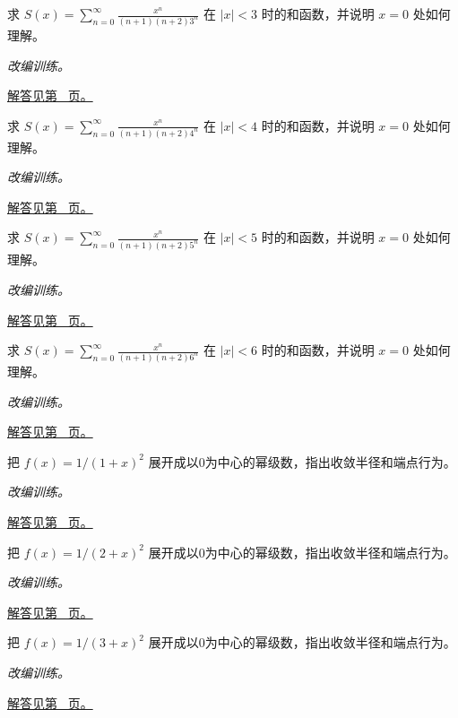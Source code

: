 \documentclass[UTF8,12pt,a4paper,fontset=fandol]{ctexart}
\begin{document}
\begin{example}[两次积分产生的系数]\label{ex:c27q15}
求 $S(x)=\displaystyle\sum_{n=0}^\infty\frac{x^n}{(n+1)(n+2)3^n}$ 在 $|x|<3$ 时的和函数，并说明 $x=0$ 处如何理解。
\par\textit{改编训练。}\par\hyperref[ans:c27q15]{解答见第~\pageref{ans:c27q15} 页。}
\end{example}
\begin{example}[两次积分产生的系数]\label{ex:c27q16}
求 $S(x)=\displaystyle\sum_{n=0}^\infty\frac{x^n}{(n+1)(n+2)4^n}$ 在 $|x|<4$ 时的和函数，并说明 $x=0$ 处如何理解。
\par\textit{改编训练。}\par\hyperref[ans:c27q16]{解答见第~\pageref{ans:c27q16} 页。}
\end{example}
\begin{example}[两次积分产生的系数]\label{ex:c27q17}
求 $S(x)=\displaystyle\sum_{n=0}^\infty\frac{x^n}{(n+1)(n+2)5^n}$ 在 $|x|<5$ 时的和函数，并说明 $x=0$ 处如何理解。
\par\textit{改编训练。}\par\hyperref[ans:c27q17]{解答见第~\pageref{ans:c27q17} 页。}
\end{example}
\begin{example}[两次积分产生的系数]\label{ex:c27q18}
求 $S(x)=\displaystyle\sum_{n=0}^\infty\frac{x^n}{(n+1)(n+2)6^n}$ 在 $|x|<6$ 时的和函数，并说明 $x=0$ 处如何理解。
\par\textit{改编训练。}\par\hyperref[ans:c27q18]{解答见第~\pageref{ans:c27q18} 页。}
\end{example}
\begin{example}[由几何展开求有理函数的级数]\label{ex:c27q19}
把 $f(x)=1/(1+x)^2$ 展开成以0为中心的幂级数，指出收敛半径和端点行为。
\par\textit{改编训练。}\par\hyperref[ans:c27q19]{解答见第~\pageref{ans:c27q19} 页。}
\end{example}
\begin{example}[由几何展开求有理函数的级数]\label{ex:c27q20}
把 $f(x)=1/(2+x)^2$ 展开成以0为中心的幂级数，指出收敛半径和端点行为。
\par\textit{改编训练。}\par\hyperref[ans:c27q20]{解答见第~\pageref{ans:c27q20} 页。}
\end{example}
\begin{example}[由几何展开求有理函数的级数]\label{ex:c27q21}
把 $f(x)=1/(3+x)^2$ 展开成以0为中心的幂级数，指出收敛半径和端点行为。
\par\textit{改编训练。}\par\hyperref[ans:c27q21]{解答见第~\pageref{ans:c27q21} 页。}
\end{example}
\end{document}
